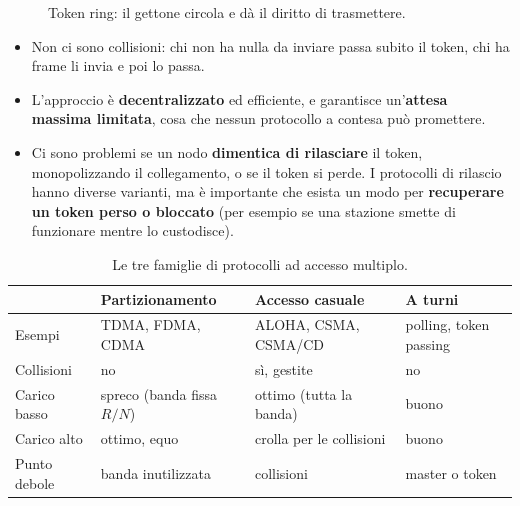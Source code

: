 
\begin{figure}[H]
\centering
{}
\caption{Token ring: il gettone circola e dà il diritto di trasmettere.}
\end{figure}

\begin{itemize}
    \item[\itick] Non ci sono collisioni: chi non ha nulla da inviare passa subito il token, chi ha frame li invia e poi lo passa.
    \item[\itick] L'approccio è \textbf{decentralizzato} ed efficiente, e garantisce un'\textbf{attesa massima limitata}, cosa che nessun
          protocollo a contesa può promettere.
    \item[\icross] Ci sono problemi se un nodo \textbf{dimentica di rilasciare} il token, monopolizzando il collegamento, o se il token si perde. I
          protocolli di rilascio hanno diverse varianti, ma è importante che esista un modo per \textbf{recuperare un token perso o bloccato} (per
          esempio se una stazione smette di funzionare mentre lo custodisce).
\end{itemize}

\begin{table}[H]
\centering
\begin{tabular}{p{3.3cm}p{3.6cm}p{3.6cm}p{3.6cm}}
\toprule
 & \textbf{Partizionamento} & \textbf{Accesso casuale} & \textbf{A turni} \\
\midrule
Esempi & TDMA, FDMA, CDMA & ALOHA, CSMA, CSMA/CD & polling, token passing \\
Collisioni & no & sì, gestite & no \\
Carico basso & spreco (banda fissa $R/N$) & ottimo (tutta la banda) & buono \\
Carico alto & ottimo, equo & crolla per le collisioni & buono \\
Punto debole & banda inutilizzata & collisioni & master o token \\
\bottomrule
\end{tabular}
\caption{Le tre famiglie di protocolli ad accesso multiplo.}
\end{table}

